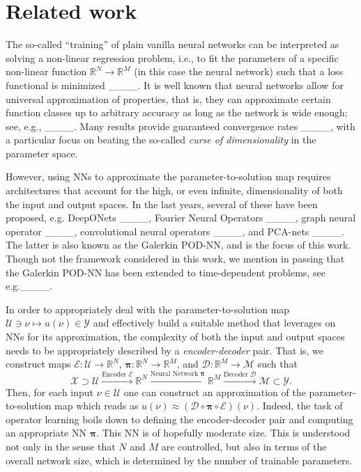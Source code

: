 \section{Related work}
\label{sec:introduction_related_work}
The so-called ``training'' of plain vanilla neural networks can be interpreted as solving a non-linear regression problem, i.e., to fit the parameters of a specific non-linear function $\mathbb{R}^N\to\mathbb{R}^M$ (in this case the neural network) such that a loss functional is minimized ____. It is well known that neural networks allow for universal approximation of properties, that is, they can approximate certain function classes up to arbitrary accuracy as long as the network is wide enough; see, e.g., ____. 
Many results provide guaranteed convergence rates ____, with a particular focus on beating the so-called \emph{curse of dimensionality} in the parameter space.

However, using NNs to approximate the parameter-to-solution map requires architectures that account for the high, or even infinite, dimensionality of both the input and output spaces. In the last years, several of these have been proposed, e.g. DeepONets
____,
Fourier Neural Operators ____,
graph neural operator ____,
convolutional neural operators ____, and PCA-nets ____.
The latter is also known as the Galerkin POD-NN, and is the focus of this work.
Though not the framework considered in this work, we mention in passing 
that the Galerkin POD-NN has been extended to time-dependent 
problems, see e.g.____.


In order to appropriately deal with the parameter-to-solution map
$\mathcal{U} \ni \nu \mapsto u(\nu) \in \mathcal{Y}$ and effectively build a suitable method that leverages on NNs
for its approximation, the complexity of both the input
and output spaces needs to be appropriately described by a 
\emph{encoder-decoder} pair.
That is, we construct maps $\mathscr{E}: \mathcal{U} \rightarrow \mathbb{R}^N $, $\boldsymbol{\pi}: \mathbb{R}^N \rightarrow\mathbb{R}^M $, and
$\mathscr{D}: \mathbb{R}^M \rightarrow \mathcal{M}$ such that
\begin{equation}\label{eq:diagram}
	\mathcal{X}
	\supset
	\mathcal{U}
	\xrightarrow{\text{Encoder }\mathscr{E} }	
	\mathbb{R}^N
	\xrightarrow{\text{Neural Network }\boldsymbol{\pi}}	
	\mathbb{R}^M
	\xrightarrow{\text{Decoder }\mathscr{D}}
	\mathcal{M}
	\subset
	\mathcal{Y}.
\end{equation}
Then, for each input $\nu \in \mathcal{U}$ one can construct
an approximation of the parameter-to-solution map  which reads
as $u(\nu) \approx \left(\mathscr{D} \circ \boldsymbol{\pi} \circ \mathscr{E}\right) (\nu)$.
Indeed, the task of operator learning boils down to defining the encoder-decoder pair and
computing an appropriate NN $\boldsymbol{\pi}$. This NN is of hopefully moderate size.
This is understood not only in the sense that $N$ and $M$ are controlled, but also in terms of the overall network size, which is determined by the number of trainable parameters.



